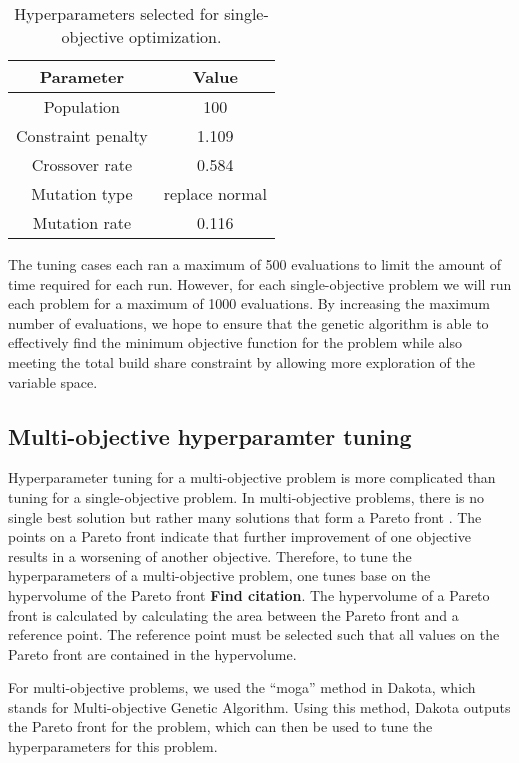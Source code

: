 \begin{table}
    \centering
    \caption{Hyperparameters selected for single-objective optimization.}
    \label{tab:soga_parameters}
    \begin{tabular}{c c}
        \hline
        Parameter & Value \\
        \hline
        Population & 100 \\
        Constraint penalty & 1.109\\
        Crossover rate & 0.584\\
        Mutation type & replace normal\\
        Mutation rate & 0.116\\
        \hline
    \end{tabular}
\end{table}

The tuning cases each ran a maximum of 500 evaluations to limit the 
amount of time required for each run. However, for each single-objective 
problem we will run each problem for a maximum of 1000 evaluations. By 
increasing the maximum number of evaluations, we hope to ensure that 
the genetic algorithm is able to effectively find the minimum objective 
function for the problem while also meeting the total build share 
constraint by allowing more exploration of the variable space. 

\subsection{Multi-objective hyperparamter tuning}
Hyperparameter tuning for a multi-objective problem is more complicated 
than tuning for a single-objective problem. In multi-objective 
problems, there is no single best solution but rather many solutions 
that form a Pareto front \cite{adams_dakota_2019}. The points on a 
Pareto front indicate that further improvement of one objective 
results in a worsening of another objective. Therefore, to tune the 
hyperparameters of a multi-objective problem, one tunes base on the 
hypervolume of the Pareto front \textbf{Find citation}. The 
hypervolume of a Pareto front is calculated by calculating the area 
between the Pareto front and a reference point. The reference point 
must be selected such that all values on the Pareto front are contained in 
the hypervolume. 

For multi-objective problems, we used the ``moga'' method in Dakota, which 
stands for Multi-objective Genetic Algorithm. Using this method, Dakota
outputs the Pareto front for the problem, which can then be used to 
tune the hyperparameters for this problem. 

